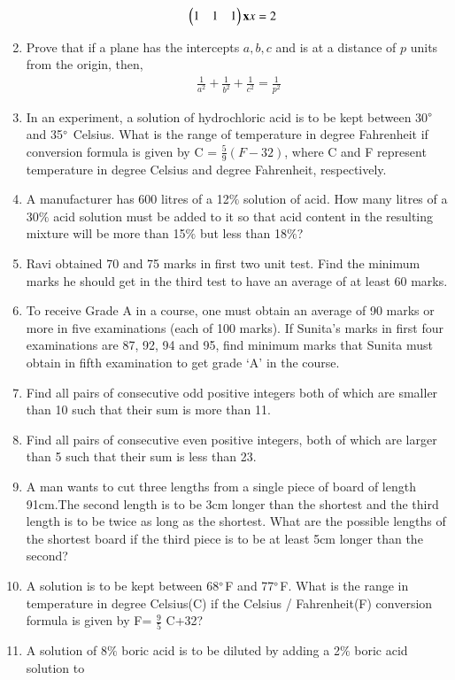 \begin{enumerate}[label=\arabic*.,ref=\thesubsection.\theenumi]
%
\begin{align}
\begin{pmatrix}1 & 1 & 1\end{pmatrix}\mathbf{x}{x}&=2
\end{align}
%
\item Prove that if a plane has the intercepts $a, b, c$ and is at a distance of $p$ units from the origin, then, 
\begin{align}
\frac{1}{a^2}+\frac{1}{b^2}+\frac{1}{c^2}=\frac{1}{p^2} 
\end{align}
     \item In an experiment, a solution of hydrochloric acid is to be kept between 30$\degree$ and 35$\degree$ Celsius. What is the range of temperature in degree Fahrenheit if conversion formula is given by 
     C = $\frac{5}{9}(F-32)$, where C and F represent temperature in degree Celsius and degree Fahrenheit, respectively.
     \item A manufacturer has 600 litres of a 12$\%$ solution of acid. How many litres of a 30$\%$ acid solution must be added to it so that acid content in the resulting mixture will be more than 15$\%$ but less than 18$\%$?
    \item Ravi obtained 70 and 75 marks in first two unit test. Find the minimum marks he should get in the third test to have an average of at least 60 marks.
    \item To receive Grade A in a course, one must obtain an average of 90 marks or more in five examinations (each of 100 marks). If Sunita’s marks in first four examinations are 87, 92, 94 and 95, find minimum marks that Sunita must obtain in fifth examination to get grade ‘A’ in the course.
    \item Find all pairs of consecutive odd positive integers both of which are smaller than 10 such that their sum is more than 11.
    \item Find all pairs of consecutive even positive integers, both of which are larger than 5 such that their sum is less than 23.
    \item A man wants to cut three lengths from a single piece of board of length 91cm.The second length is to be 3cm longer than the shortest and the third length is to be twice as long as the shortest. What are the possible lengths of the shortest board if the third piece is to be at least 5cm longer than the second?
    \item A solution is to be kept between 68$\degree$F and 77$\degree$F. What is the range in temperature in degree Celsius(C) if the Celsius / Fahrenheit(F) conversion formula is given by
    F= $\frac{9}{5}$ C+32?
    \item A solution of 8$\%$ boric acid is to be diluted by adding a 2$\%$ boric acid solution to

\end{enumerate}
